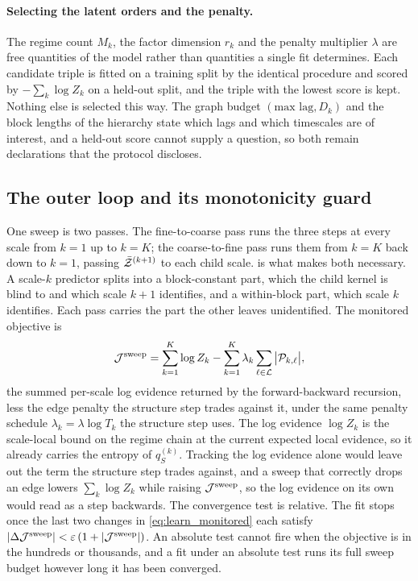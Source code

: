 \paragraph{Selecting the latent orders and the penalty.}
The regime count $M_k$, the factor dimension $r_k$ and the penalty multiplier $\lambda$ are free
quantities of the model rather than quantities a single fit determines. Each candidate triple is
fitted on a training split by the identical procedure and scored by
$-\sum_k \log Z_k$ on a held-out split, and the triple with the lowest score is kept. Nothing else
is selected this way. The graph budget $(\text{max lag}, D_k)$ and the block lengths of the
hierarchy state which lags and which timescales are of interest, and a held-out score cannot
supply a question, so both remain declarations that the protocol discloses.

\subsection{The outer loop and its monotonicity guard}
\label{sec:learning:outer}

One sweep is two passes. The fine-to-coarse pass runs the three steps at every
scale from $k=1$ up to $k=K$; the coarse-to-fine pass runs them from $k=K$ back
down to $k=1$, passing $\bar{{\mathcal{Z}}}^{(k+1)}$ to each child scale.
 is what makes both necessary. A scale-$k$
predictor splits into a block-constant part, which the child kernel is blind to
and which scale $k+1$ identifies, and a within-block part, which scale $k$
identifies. Each pass carries the part the other leaves unidentified. The
monitored objective is
\begin{align}
{\mathcal{J}}^{\mathrm{sweep}}
=
\sum_{k=1}^{K} \log Z_k
-
\sum_{k=1}^{K} \lambda_k \sum_{\ell \in {\mathcal{L}}} \big|{\mathcal{P}}_{k,\ell}\big|,
\label{eq:learn_monitored}
\end{align}
the summed per-scale log evidence returned by the forward-backward recursion, less the edge
penalty the structure step trades against it, under the same penalty schedule
$\lambda_k = \lambda \log T_k$ the structure step uses. The log evidence $\log Z_k$ is the
scale-local bound on the regime chain at the current expected local evidence, so it already
carries the entropy of $q_S^{(k)}$. Tracking the log evidence alone would leave out the
term the structure step trades against, and a sweep that correctly drops an edge lowers
$\sum_k \log Z_k$ while raising ${\mathcal{J}}^{\mathrm{sweep}}$, so the log evidence on its own would read
as a step backwards. The convergence
test is relative. The fit stops once the last two changes in \cref{eq:learn_monitored} each
satisfy $|\Delta {\mathcal{J}}^{\mathrm{sweep}}| < \varepsilon\,(1 + |{\mathcal{J}}^{\mathrm{sweep}}|)$. An absolute
test cannot fire when the objective is in the hundreds or thousands, and a fit under an absolute
test runs its full sweep budget however long it has been converged.

